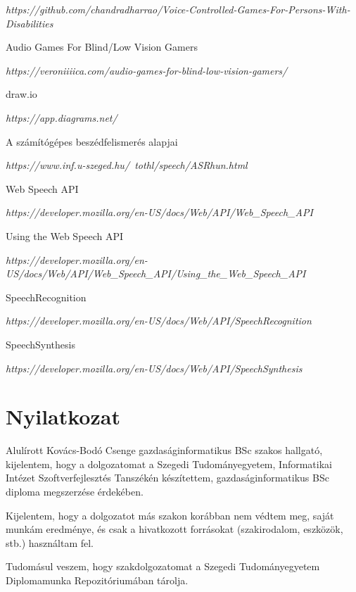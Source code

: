 \documentclass[12pt]{report}
\begin{document}
\begin{thebibliography}{99}
\emph{https://github.com/chandradharrao/Voice-Controlled-Games-For-Persons-With-Disabilities}

Audio Games For Blind/Low Vision Gamers

\emph{https://veroniiiica.com/audio-games-for-blind-low-vision-gamers/}

draw.io

\emph{https://app.diagrams.net/}

A számítógépes beszédfelismerés alapjai

\emph{https://www.inf.u-szeged.hu/~tothl/speech/ASRhun.html}

Web Speech API

\emph{https://developer.mozilla.org/en-US/docs/Web/API/Web_Speech_API}

Using the Web Speech API

\emph{https://developer.mozilla.org/en-US/docs/Web/API/Web_Speech_API/Using_the_Web_Speech_API}

SpeechRecognition

\emph{https://developer.mozilla.org/en-US/docs/Web/API/SpeechRecognition}

SpeechSynthesis

\emph{https://developer.mozilla.org/en-US/docs/Web/API/SpeechSynthesis}

\end{thebibliography}

\chapter*{Nyilatkozat}

\noindent
Alulírott Kovács-Bodó Csenge gazdaságinformatikus BSc szakos hallgató, kijelentem, hogy a dolgozatomat a Szegedi Tudományegyetem, Informatikai Intézet Szoftverfejlesztés Tanszékén készítettem, gazdaságinformatikus BSc diploma megszerzése érdekében. \hfill \break

\noindent
Kijelentem, hogy a dolgozatot más szakon korábban nem védtem meg, saját munkám eredménye, és csak a hivatkozott forrásokat (szakirodalom, eszközök, stb.) használtam fel. \hfill \break

\noindent
Tudomásul veszem, hogy szakdolgozatomat a Szegedi Tudományegyetem Diplomamunka Repozitóriumában tárolja.

\vspace*{2cm}
\end{document}
